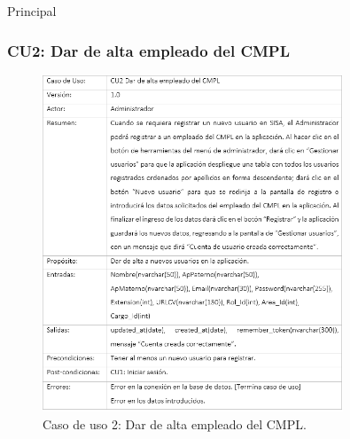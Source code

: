 \begin{UCtrayectoria}{Principal}
		\subsubsection{CU2: Dar de alta empleado del CMPL}
			\begin{figure}[htbp!]
				\centering
					\includegraphics[width=0.8\textwidth]{images/CU/CU2}
					\caption{Caso de uso 2: Dar de alta empleado del CMPL.}
				\label{Tabla}
			\end{figure}
			

\end{UCtrayectoria}
